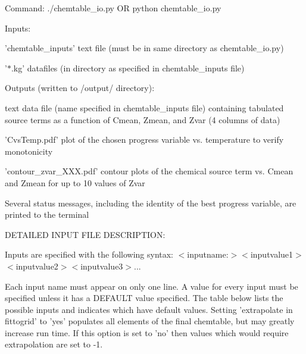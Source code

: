 Command: ./chemtable\_\-io.py OR python chemtable\_\-io.py

Inputs:
\begin{DoxyItemize}
\item 'chemtable\_\-inputs' text file (must be in same directory as chemtable\_\-io.py)
\item '$\ast$.kg' datafiles (in directory as specified in chemtable\_\-inputs file)
\end{DoxyItemize}

Outputs (written to /output/ directory):
\begin{DoxyItemize}
\item text data file (name specified in chemtable\_\-inputs file) containing tabulated source terms as a function of Cmean, Zmean, and Zvar (4 columns of data)
\item 'CvsTemp.pdf' plot of the chosen progress variable vs. temperature to verify monotonicity
\item 'contour\_\-zvar\_\-XXX.pdf' contour plots of the chemical source term vs. Cmean and Zmean for up to 10 values of Zvar
\item Several status messages, including the identity of the best progress variable, are printed to the terminal
\end{DoxyItemize}

DETAILED INPUT FILE DESCRIPTION:

Inputs are specified with the following syntax: $<$inputname:$>$$<$inputvalue1$>$$<$inputvalue2$>$$<$inputvalue3$>$...

Each input name must appear on only one line. A value for every input must be specified unless it has a DEFAULT value specified. The table below lists the possible inputs and indicates which have default values. Setting 'extrapolate in fittogrid' to 'yes' populates all elements of the final chemtable, but may greatly increase run time. If this option is set to 'no' then values which would require extrapolation are set to -\/1.

